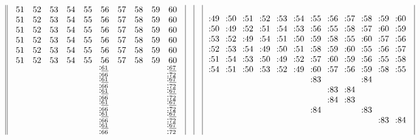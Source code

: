 \documentclass[12pt,a4paper]{amsart}
\begin{document}
\begin{align*}
\begin{array}{r||c|c|c|c|c|c|c}
&
  \begin{array}{cccccccccc}
51&52&53&54&55&56&57&58&59&60\\
51&52&53&54&55&56&57&58&59&60\\
51&52&53&54&55&56&57&58&59&60\\
51&52&53&54&55&56&57&58&59&60\\
51&52&53&54&55&56&57&58&59&60\\
51&52&53&54&55&56&57&58&59&60\\
&&&&&^{\underline{\llap:61}}_{\llap:66}&&&&^{\underline{\llap:67}}_{\llap:{72}}\\
&&&&&^{\underline{\llap:61}}_{\llap:66}&&&&^{\underline{\llap:67}}_{\llap:{72}}\\
&&&&&^{\underline{\llap:61}}_{\llap:66}&&&&^{\underline{\llap:67}}_{\llap:{72}}\\
&&&&&^{\underline{\llap:61}}_{\llap:66}&&&&^{\underline{\llap:67}}_{\llap:{72}}\\
&&&&&^{\underline{\llap:61}}_{\llap:66}&&&&^{\underline{\llap:67}}_{\llap:{72}}\\
&&&&&^{\underline{\llap:61}}_{\llap:66}&&&&^{\underline{\llap:67}}_{\llap:{72}}\\
  \end{array}
&
&
&
  \begin{array}{cccccccccccc}
\llap:49&\llap:50&\llap:51&\llap:52&\llap:53&\llap:54&\llap:55&\llap:56&\llap:57&\llap:58&\llap:59&\llap:60\\
\llap:50&\llap:49&\llap:52&\llap:51&\llap:54&\llap:53&\llap:56&\llap:55&\llap:58&\llap:57&\llap:60&\llap:59\\
\llap:53&\llap:52&\llap:49&\llap:54&\llap:51&\llap:50&\llap:59&\llap:58&\llap:55&\llap:60&\llap:57&\llap:56\\
\llap:52&\llap:53&\llap:54&\llap:49&\llap:50&\llap:51&\llap:58&\llap:59&\llap:60&\llap:55&\llap:56&\llap:57\\
\llap:51&\llap:54&\llap:53&\llap:50&\llap:49&\llap:52&\llap:57&\llap:60&\llap:59&\llap:56&\llap:55&\llap:58\\
\llap:54&\llap:51&\llap:50&\llap:53&\llap:52&\llap:49&\llap:60&\llap:57&\llap:56&\llap:59&\llap:58&\llap:55\\
&&&&&&\llap:83&&&\llap:84&&\\
&&&&&&&\llap:83&\llap:84&&&\\
&&&&&&&\llap:84&\llap:83&&&\\
&&&&&&\llap:84&&&\llap:83&&\\
&&&&&&&&&&\llap:83&\llap:84\\

\end{array}
\end{array}
\end{align*}
\end{document}
